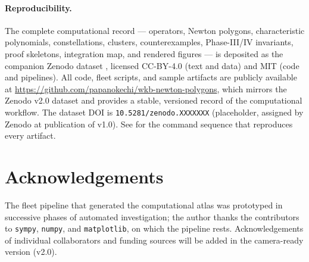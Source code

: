 \documentclass[11pt,a4paper]{article}
\theoremstyle{plain}
\theoremstyle{definition}
\theoremstyle{remark}
\begin{document}
\paragraph{Reproducibility.}
The complete computational record --- operators, Newton polygons,
characteristic polynomials, constellations, clusters, counterexamples,
Phase-III/IV invariants, proof skeletons, integration map, and
rendered figures --- is deposited as the companion Zenodo dataset
\cite{wkb_dataset_v1}, licensed CC-BY-4.0 (text and data) and MIT
(code and pipelines).
All code, fleet scripts, and sample artifacts are publicly available
at \url{https://github.com/papanokechi/wkb-newton-polygons}, which
mirrors the Zenodo v2.0 dataset and provides a stable, versioned
record of the computational workflow.
The dataset DOI is \texttt{10.5281/zenodo.XXXXXXX}
(placeholder, assigned by Zenodo at publication of v1.0). See
 for the command sequence that reproduces
every artifact.


\section*{Acknowledgements}\label{sec:ack}

The fleet pipeline that generated the computational atlas was prototyped
in successive phases of automated investigation; the author thanks the
contributors to \texttt{sympy}, \texttt{numpy}, and \texttt{matplotlib},
on which the pipeline rests. Acknowledgements of individual collaborators
and funding sources will be added in the camera-ready version (v2.0).




\end{document}
